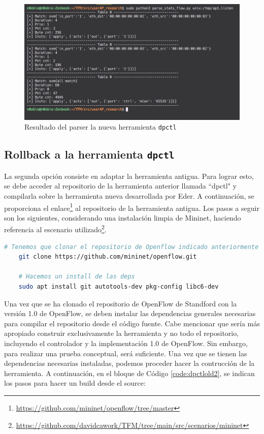 \begin{figure}[ht]
    \centering
    \includegraphics[width=\textwidth]{archivos/img/dev/dpctl_4.png}
    \caption{Resultado del parser la nueva herramienta \texttt{dpctl}}
    \label{fig:dpctl_4}
\end{figure}

\subsection{Rollback a la herramienta \texttt{dpctl}}

La segunda opción consiste en adaptar la herramienta antigua. Para lograr esto, se debe acceder al repositorio de la herramienta anterior llamada ``dpctl" y compilarla sobre la herramienta nueva desarrollada por Eder. A continuación, se proporciona el enlace\footnote{\url{https://github.com/mininet/openflow/tree/master}} al repositorio de la herramienta antigua. Los pasos a seguir son los siguientes, considerando una instalación limpia de Mininet, haciendo referencia al escenario utilizado\footnote{\url{https://github.com/davidcawork/TFM/tree/main/src/scenarios/mininet}}.

\begin{lstlisting}[language= bash, style=Consola, caption={Instalación de las dependencias de la nueva versión de dpctl},label=code:dpctlold1]
    # Tenemos que clonar el repositorio de Openflow indicado anteriormente
    git clone https://github.com/mininet/openflow.git

    # Hacemos un install de las deps
    sudo apt install git autotools-dev pkg-config libc6-dev
\end{lstlisting}
\vspace{0.5cm}


Una vez que se ha clonado el repositorio de OpenFlow de Standford con la versión 1.0 de OpenFlow, se deben instalar las dependencias generales necesarias para compilar el repositorio desde el código fuente. Cabe mencionar que sería más apropiado construir exclusivamente la herramienta y no todo el repositorio, incluyendo el controlador y la implementación 1.0 de OpenFlow. Sin embargo, para realizar una prueba conceptual, será suficiente. Una vez que se tienen las dependencias necesarias instaladas, podemos proceder hacer la contrucción de la herramienta. A continuación, en el bloque de Código \ref{code:dpctlold2}, se indican los pasos para hacer un build desde el source:

